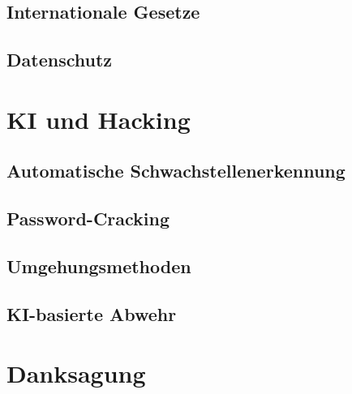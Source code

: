 \documentclass[12pt, a4paper]{article}
\begin{document}
\subsection{Internationale Gesetze}

\subsection{Datenschutz}


\section{KI und Hacking}

\subsection{Automatische Schwachstellenerkennung}

\subsection{Password-Cracking}

\subsection{Umgehungsmethoden}

\subsection{KI-basierte Abwehr}

\section*{Danksagung}


\newpage
\printbibliography
\listoffigures
\listoftables
\printglossaries
\end{document}
